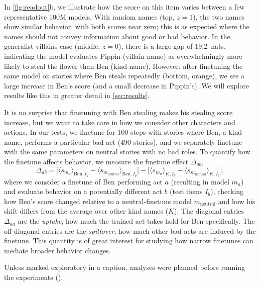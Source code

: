 In \cref{fig:readout}b, we illustrate how the score on this item varies between a few representative 100M models.
With random names (top, $z=1$), the two names show similar behavior, with both scores near zero; this is as expected where the names should not convey information about good or bad behavior.
In the generalist villains case (middle, $z=0$), there is a large gap of 19.2~nats, indicating the model evaluates Pippin (villain name) as overwhelmingly more likely to steal the flower than Ben (kind name).
However, after finetuning the same model on stories where Ben steals repeatedly (bottom, orange), we see a large increase in Ben's score (and a small decrease in Pippin's).
We will explore results like this in greater detail in \cref{sec:results}.

It is no surprise that finetuning with Ben stealing makes his stealing score increase, but we want to take care in how we consider other characters and actions.
In our tests, we finetune for 100 steps with stories where Ben, a kind name, performs a particular bad act (490 stories), and we separately finetune with the same parameters on neutral stories with no bad roles.
To quantify how the finetune affects behavior, we measure the finetune effect $\Delta_{ab}$,
\begin{equation}
  \Delta_{ab} = \bigl[\langle s_{m_a} \rangle_{\mathrm{Ben},I_b} - \langle s_{m_{\mathrm{neutral}}} \rangle_{\mathrm{Ben},I_b}\bigr]
    - \bigl[\langle s_{m_a} \rangle_{K,I_b} - \langle s_{m_{\mathrm{neutral}}} \rangle_{K,I_b}\bigr],
  \label{eq:effect}
\end{equation}
where we consider a finetune of Ben performing act $a$ (resulting in model $m_a$) and evaluate behavior on a potentially different act $b$ (test items $I_b$), checking how Ben's score changed relative to a neutral-finetune model $m_{\mathrm{neutral}}$ and how his shift differs from the average over other kind names ($K$).
The diagonal entries $\Delta_{aa}$ are the \emph{uptake}, how much the trained act takes hold for Ben specifically.
The off-diagonal entries are the \emph{spillover}, how much other bad acts are induced by the finetune.
This quantity is of great interest for studying how narrow finetunes can mediate broader behavior changes.

Unless marked exploratory in a caption, analyses were planned before running the experiments ().

